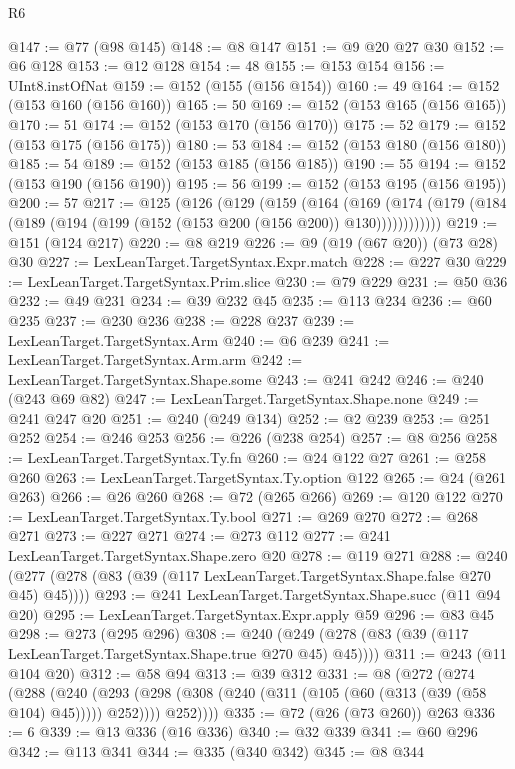 \begin{lexlean}{R6}
\begin{coremodule}
@147 := @77 (@98 @145)
@148 := @8 @147
@151 := @9 @20 @27 @30
@152 := @6 @128
@153 := @12 @128
@154 := 48
@155 := @153 @154
@156 := UInt8.instOfNat
@159 := @152 (@155 (@156 @154))
@160 := 49
@164 := @152 (@153 @160 (@156 @160))
@165 := 50
@169 := @152 (@153 @165 (@156 @165))
@170 := 51
@174 := @152 (@153 @170 (@156 @170))
@175 := 52
@179 := @152 (@153 @175 (@156 @175))
@180 := 53
@184 := @152 (@153 @180 (@156 @180))
@185 := 54
@189 := @152 (@153 @185 (@156 @185))
@190 := 55
@194 := @152 (@153 @190 (@156 @190))
@195 := 56
@199 := @152 (@153 @195 (@156 @195))
@200 := 57
@217 := @125
    (@126
      (@129
        (@159
          (@164
            (@169 (@174 (@179 (@184 (@189 (@194 (@199 (@152 (@153 @200 (@156 @200)) @130))))))))))))
@219 := @151 (@124 @217)
@220 := @8 @219
@226 := @9 (@19 (@67 @20)) (@73 @28) @30
@227 := LexLeanTarget.TargetSyntax.Expr.match
@228 := @227 @30
@229 := LexLeanTarget.TargetSyntax.Prim.slice
@230 := @79 @229
@231 := @50 @36
@232 := @49 @231
@234 := @39 @232 @45
@235 := @113 @234
@236 := @60 @235
@237 := @230 @236
@238 := @228 @237
@239 := LexLeanTarget.TargetSyntax.Arm
@240 := @6 @239
@241 := LexLeanTarget.TargetSyntax.Arm.arm
@242 := LexLeanTarget.TargetSyntax.Shape.some
@243 := @241 @242
@246 := @240 (@243 @69 @82)
@247 := LexLeanTarget.TargetSyntax.Shape.none
@249 := @241 @247 @20
@251 := @240 (@249 @134)
@252 := @2 @239
@253 := @251 @252
@254 := @246 @253
@256 := @226 (@238 @254)
@257 := @8 @256
@258 := LexLeanTarget.TargetSyntax.Ty.fn
@260 := @24 @122 @27
@261 := @258 @260
@263 := LexLeanTarget.TargetSyntax.Ty.option @122
@265 := @24 (@261 @263)
@266 := @26 @260
@268 := @72 (@265 @266)
@269 := @120 @122
@270 := LexLeanTarget.TargetSyntax.Ty.bool
@271 := @269 @270
@272 := @268 @271
@273 := @227 @271
@274 := @273 @112
@277 := @241 LexLeanTarget.TargetSyntax.Shape.zero @20
@278 := @119 @271
@288 := @240 (@277 (@278 (@83 (@39 (@117 LexLeanTarget.TargetSyntax.Shape.false @270 @45) @45))))
@293 := @241 LexLeanTarget.TargetSyntax.Shape.succ (@11 @94 @20)
@295 := LexLeanTarget.TargetSyntax.Expr.apply @59
@296 := @83 @45
@298 := @273 (@295 @296)
@308 := @240 (@249 (@278 (@83 (@39 (@117 LexLeanTarget.TargetSyntax.Shape.true @270 @45) @45))))
@311 := @243 (@11 @104 @20)
@312 := @58 @94
@313 := @39 @312
@331 := @8
    (@272
      (@274
        (@288
          (@240
            (@293 (@298 (@308 (@240 (@311 (@105 (@60 (@313 (@39 (@58 @104) @45))))) @252))))
            @252))))
@335 := @72 (@26 (@73 @260)) @263
@336 := 6
@339 := @13 @336 (@16 @336)
@340 := @32 @339
@341 := @60 @296
@342 := @113 @341
@344 := @335 (@340 @342)
@345 := @8 @344

\end{coremodule}
\end{lexlean}
